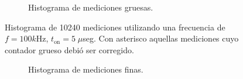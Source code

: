 \begin{figure}[H]
\begin{subfigure}[t]{0.45\textwidth}
{           }
           \caption{Histograma de mediciones gruesas.}
     \end{subfigure}
     \caption{Histograma de 10240 mediciones utilizando una frecuencia de $f=100k$Hz, $t_{\text{on}}=5 \; \mu$seg. 
     Con asterisco aquellas mediciones cuyo contador grueso debió ser corregido.}
\end{figure}

\clearpage

\begin{figure}[H]
     \centering
     \begin{subfigure}[t]{0.45\textwidth} %
           \centering
           \caption{Histograma de mediciones finas.}
           \label{fig: histograma_66}
     \end{subfigure}%
     \hspace{10pt}%
     \begin{subfigure}[t]{0.45\textwidth} %
           \centering
\end{subfigure}
\end{figure}
